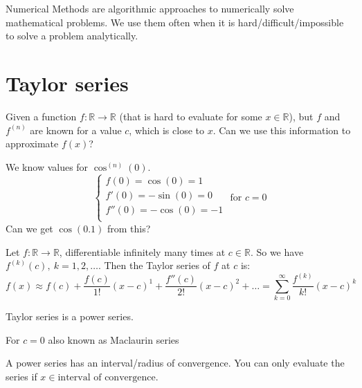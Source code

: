 
\begin{definition}
    Numerical Methods are algorithmic approaches to numerically solve mathematical problems.
    We use them often when it is hard/difficult/impossible to solve a problem analytically.
\end{definition}

\section{Taylor series}
Given a function $f : \mathbb{R} \to \mathbb{R}$
(that is hard to evaluate for some $x \in \mathbb{R}$),
but $f$ and $f^{(n)}$ are known for a value $c$, which is close to $x$.
Can we use this information to approximate $f(x)$?

We know values for $\cos^{(n)}(0)$.
\[
    \begin{cases}
        f(0) = \cos(0) = 1\\
        f'(0) = -\sin(0) = 0\\
        f''(0) = -\cos(0) = -1\\
    \end{cases} \text{ for } c = 0
\]
Can we get $\cos(0.1)$ from this?

\begin{definition}
    Let $f : \mathbb{R} \to \mathbb{R}$, differentiable 
    infinitely many times at $c \in \mathbb{R}$.
    So we have $f^{(k)}(c),\ k=1,2,\dots $. Then the Taylor series of $f$ at $c$ is:
    \[
        f(x) \approx f(c) + \frac{f(c)}{1!}(x-c)^1 + \frac{f''(c)}{2!}(x-c)^2 + \dots =
        \sum_{k=0}^{\infty} \frac{f^{(k)}}{k!} (x - c)^k
    \]
\end{definition}

\begin{remark}
    Taylor series is a power series.
\end{remark}

\begin{remark}
    For $c = 0$ also known as Maclaurin series
\end{remark}

\begin{remark}
    A power series has an interval/radius of convergence.
    You can only evaluate the series if $x \in \text{interval of convergence}$.
\end{remark}

